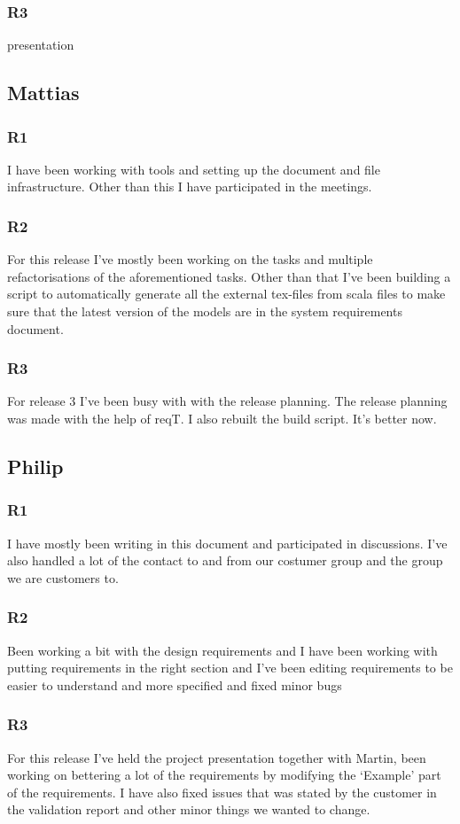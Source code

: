 \documentclass[a4paper]{article}
\begin{document}
		\subsubsection{R3}
			presentation
	
	\subsection{Mattias}
		\subsubsection{R1}
		I have been working with tools and setting up the document and file infrastructure. Other than this I have participated in the meetings.
		\subsubsection{R2}
		For this release I've mostly been working on the tasks and multiple refactorisations of the aforementioned tasks. Other than that I've been building a script to automatically generate all the external tex-files from scala files to make sure that the latest version of the models are in the system requirements document.
		\subsubsection{R3}
		For release 3 I've been busy with with the release planning. The release planning was made with the help of reqT. I also rebuilt the build script. It's better now.

	\subsection{Philip}
		\subsubsection{R1}
	I have mostly been writing in this document and participated in discussions. I've also handled a lot of the contact to and from our costumer group and the group we are customers to.
		\subsubsection{R2}
		Been working a bit with the design requirements and I have been working with putting requirements in the right section and I've been editing requirements to be easier to understand and more specified and fixed minor bugs
		\subsubsection{R3}
		For this release I've held the project presentation together with Martin, been working on bettering a lot of the requirements by modifying the `Example' part of the requirements. I have also fixed issues that was stated by the customer in the validation report and other minor things we wanted to change. 
\end{document}

